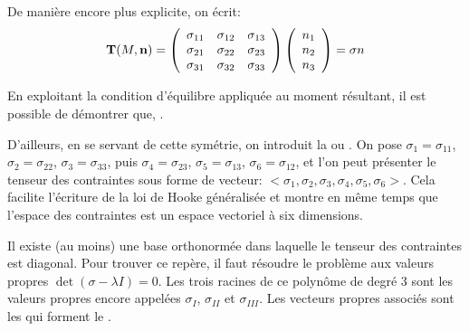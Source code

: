 \medskip
De manière encore plus explicite, on écrit:
\begin{equation}
\mathbf{T}(M,\mathbf{n}) =
\left( \begin{array}{ccc} \sigma_{11}&\sigma_{12}&\sigma_{13}\\ \sigma_{21}&\sigma_{22}&\sigma_{23}\\
\sigma_{31}&\sigma_{32}&\sigma_{33}\end{array}\right)
\left( \begin{array}{c} n_1\\n_2\\n_3\end{array}\right)
= \sigma n
\end{equation}



\medskip
En exploitant la condition d'équilibre appliquée au moment résultant, il est possible de démontrer que, 
.

D'ailleurs, en se servant de cette symétrie, on introduit la  
ou .
On pose $\sigma_1=\sigma_{11}$,$\sigma_2=\sigma_{22}$, $\sigma_3=\sigma_{33}$,
puis $\sigma_4=\sigma_{23}$, $\sigma_5=\sigma_{13}$, $\sigma_6=\sigma_{12}$,
et l'on peut présenter le tenseur des contraintes sous forme de vecteur:
$<\sigma_1, \sigma_2, \sigma_3, \sigma_4, \sigma_5, \sigma_6>$.
Cela facilite l'écriture de la loi de Hooke généralisée et montre en même temps
que l'espace des contraintes est un espace vectoriel à six dimensions.

\medskip
Il existe (au moins) une base orthonormée dans laquelle le tenseur des contraintes est diagonal.
Pour trouver ce repère, il faut résoudre le problème aux valeurs propres
$\det(\sigma-\lambda I)=0$. Les trois racines de ce polynôme de degré 3 sont les
valeurs propres encore appelées  $\sigma_I$, 
$\sigma_{II}$ et $\sigma_{III}$. Les vecteurs propres associés sont les  qui forment le .

